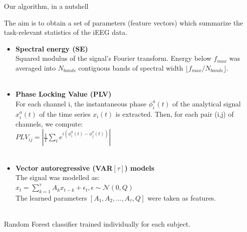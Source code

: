 \documentclass[final,t,overlay, xcolor=table, sans, mathserif]{beamer}
\begin{document}
\begin{frame}{}
\begin{columns}[t]
\begin{column}{.35\linewidth}
\begin{block}{Our algorithm, in a nutshell}
\begin{minipage}[t]{0.95\linewidth}
\begin{tcolorbox}[title=2. Feature extraction]
The aim is to obtain a set of parameters (feature vectors) which summarize the task-relevant statistics of the iEEG data.
\qquad \\

\begin{itemize}
\item {\bf Spectral energy (SE)} \\
Squared modulus of the signal's Fourier transform. Energy below $f_{max}$ was averaged into $N_{bands}$ contiguous
bands of spectral width $\lfloor f_{max}/N_{bands}\rfloor$. \\
\qquad \\

\item {\bf Phase Locking Value (PLV)} \\
For each channel i, the instantaneous phase $\phi_{i}^{a}(t)$ of the analytical signal $x_{i}^{a}(t)$
of the time series $x_{i}(t)$ is extracted. Then, for each pair (i,j) of channels,
we compute: \\
$PLV_{ij}=\left|\frac{1}{T}\sum_{t}e^{i(\phi_{i}^{a}(t)-\phi_{j}^{a}(t))}\right|$ \\
\qquad \\

\item {\bf Vector autoregressive (VAR$\left[\tau\right]$) models} \\
The signal was modelled as: \\
$x_{t}=\sum_{k=1}^{\tau}A_{k}x_{t-k}+\epsilon_{t}, \epsilon\sim\mathcal{N}(0,Q)$ \\
The learned parameters $[A_{1},A_{2},...,A_{\tau},Q]$ were taken as features. \\
\qquad \\

\end{itemize}
\end{tcolorbox}
\end{minipage}


\begin{minipage}[t]{0.95\linewidth}
\begin{tcolorbox}[title=3. Clasification]
Random Forest classifier trained individually for each subject.
\end{tcolorbox}
\end{minipage}

\end{block}




\end{column}
\end{columns}
\end{frame}
\end{document}
